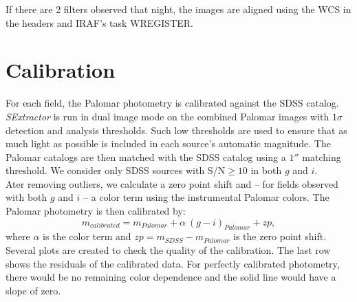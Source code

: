 \documentclass{article}
\begin{document}
\noindent If there are 2 filters observed that night, the images are 
aligned using the WCS in the headers and IRAF's task WREGISTER.

\section{Calibration}\label{sec:cal}
For each field, the Palomar photometry is calibrated against the SDSS catalog. 
\textit{SExtractor} is run in dual image mode
on the combined Palomar images with 
$1\sigma$ detection and analysis thresholds. 
Such low thresholds are used to ensure that as much
light as possible is included in each source's automatic magnitude. The 
Palomar catalogs are then matched with the SDSS catalog using a $1''$
matching threshold. We consider only SDSS sources with S/N$\geq10$ in 
both $g$ and $i$. \\

\noindent Ater removing outliers, we calculate a zero point shift and -- 
for fields
observed with both $g$ and $i$ -- a color term
using the instrumental Palomar colors. 
The Palomar photometry is then calibrated by:
\begin{equation}
m_{calibrated} = m_{Palomar} + \alpha~(g-i)_{Palomar} + zp,
\label{eqn:cal}
\end{equation}
where $\alpha$ is the color term
and $zp = m_{SDSS} - m_{Palomar}$ is the zero point shift. Several plots
are created to check the quality of the calibration.
The last row shows the residuals of the calibrated 
data. For perfectly calibrated photometry, there would be no remaining
color dependence and the solid line would have a slope of zero. \\

\end{document}
